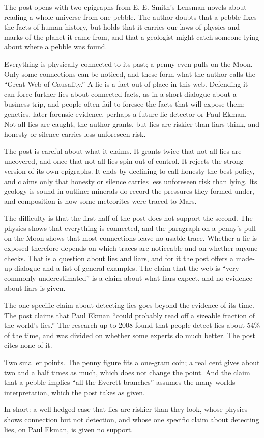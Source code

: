 \begin{afterword}
\summaryhead

The post opens with two epigraphs from E. E. Smith's Lensman novels about reading a whole universe from one pebble. The author doubts that a pebble fixes the facts of human history, but holds that it carries our laws of physics and marks of the planet it came from, and that a geologist might catch someone lying about where a pebble was found.

Everything is physically connected to its past; a penny even pulls on the Moon. Only some connections can be noticed, and these form what the author calls the ``Great Web of Causality.'' A lie is a fact out of place in this web. Defending it can force further lies about connected facts, as in a short dialogue about a business trip, and people often fail to foresee the facts that will expose them: genetics, later forensic evidence, perhaps a future lie detector or Paul Ekman. Not all lies are caught, the author grants, but lies are riskier than liars think, and honesty or silence carries less unforeseen risk.

\responsehead

The post is careful about what it claims. It grants twice that not all lies are uncovered, and once that not all lies spin out of control. It rejects the strong version of its own epigraphs. It ends by declining to call honesty the best policy, and claims only that honesty or silence carries less unforeseen risk than lying. Its geology is sound in outline: minerals do record the pressures they formed under, and composition is how some meteorites were traced to Mars.

The difficulty is that the first half of the post does not support the second. The physics shows that everything is connected, and the paragraph on a penny's pull on the Moon shows that most connections leave no usable trace. Whether a lie is exposed therefore depends on which traces are noticeable and on whether anyone checks. That is a question about lies and liars, and for it the post offers a made-up dialogue and a list of general examples. The claim that the web is ``very commonly underestimated'' is a claim about what liars expect, and no evidence about liars is given.

The one specific claim about detecting lies goes beyond the evidence of its time. The post claims that Paul Ekman ``could probably read off a sizeable fraction of the world's lies.'' The research up to 2008 found that people detect lies about 54\% of the time, and was divided on whether some experts do much better. The post cites none of it.

Two smaller points. The penny figure fits a one-gram coin; a real cent gives about two and a half times as much, which does not change the point. And the claim that a pebble implies ``all the Everett branches'' assumes the many-worlds interpretation, which the post takes as given.

In short: a well-hedged case that lies are riskier than they look, whose physics shows connection but not detection, and whose one specific claim about detecting lies, on Paul Ekman, is given no support.
\end{afterword}
